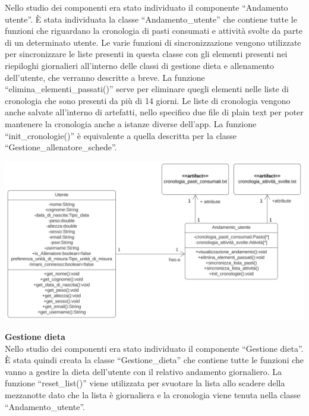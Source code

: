 \documentclass{article}
\begin{document}
      Nello studio dei componenti era stato individuato il componente “Andamento utente”. È stata individuata la classe “Andamento\_utente” che contiene tutte le funzioni che riguardano la cronologia di pasti consumati e attività svolte da parte di un determinato utente. Le varie funzioni di sincronizzazione vengono utilizzate per sincronizzare le liste presenti in questa classe con gli elementi presenti nei riepiloghi giornalieri all’interno delle classi di gestione dieta e allenamento dell’utente, che verranno descritte a breve. La funzione “elimina\_elementi\_passati()” serve per eliminare quegli elementi nelle liste di cronologia che sono presenti da più di 14 giorni.
      Le liste di cronologia vengono anche salvate all’interno di artefatti, nello specifico due file di plain text per poter mantenere la cronologia anche a istanze diverse dell’app. La funzione “init\_cronologie()” è equivalente a quella descritta per la classe “Gestione\_allenatore\_schede”.\\

      \begin{center}
            \includegraphics[scale=0.5]{classi/Andamento_utente.png}
      \end{center}

      {\large\textbf{Gestione dieta}}\\

      Nello studio dei componenti era stato individuato il componente “Gestione dieta”. È stata quindi creata la classe “Gestione\_dieta” che contiene tutte le funzioni che vanno a gestire la dieta dell’utente con il relativo andamento giornaliero. La funzione “reset\_list()” viene utilizzata per svuotare la lista allo scadere della mezzanotte dato che la lista è giornaliera e la cronologia viene tenuta nella classe “Andamento\_utente”.\\
\end{document}
